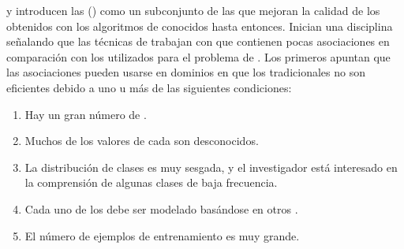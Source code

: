 \citet{AliManganarisSrikant-PartialClassificationUsingAR-1997} y \citet{LiuHsuMa-IntegratingClassificationAndARM-1998} introducen las \CARs (\sCAR) como un subconjunto de las \ARs que mejoran la calidad de los \Clasificadores obtenidos con los algoritmos de \Clasificacion conocidos hasta entonces. Inician una disciplina señalando que las técnicas de \ARM trabajan con \transacciones que contienen pocas asociaciones en comparación con los \datasets utilizados para el problema de \Clasificacion. Los primeros apuntan que las asociaciones pueden usarse en dominios en que los \clasificadores tradicionales no son eficientes debido a uno u más de las siguientes condiciones:
\begin{enumerate}
  \item Hay un gran número de \atributos.
  \item Muchos de los valores de cada \atributo son desconocidos.
  \item La distribución de clases es muy sesgada, y el investigador está interesado en la comprensión de algunas clases de baja frecuencia.
  \item Cada uno de los \atributos debe ser modelado basándose en otros \atributos.
  \item El número de ejemplos de entrenamiento es muy grande.
\end{enumerate}

